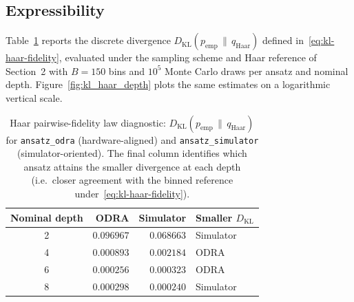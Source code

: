 \documentclass[11pt]{article}
\begin{document}
\subsection{Expressibility}

Table~\ref{tab:kl_haar} reports the discrete divergence $D_{\mathrm{KL}}(p_{\mathrm{emp}}\,\|\,q_{\mathrm{Haar}})$ defined in~\eqref{eq:kl-haar-fidelity}, evaluated under the sampling scheme and Haar reference of Section~2 with $B=150$ bins and $10^{5}$ Monte Carlo draws per ansatz and nominal depth. Figure~\ref{fig:kl_haar_depth} plots the same estimates on a logarithmic vertical scale.

\begin{table}[htbp]
    \centering
    \caption{Haar pairwise-fidelity law diagnostic: $D_{\mathrm{KL}}(p_{\mathrm{emp}}\,\|\,q_{\mathrm{Haar}})$ for \texttt{ansatz\_odra} (hardware-aligned) and \texttt{ansatz\_simulator} (simulator-oriented). The final column identifies which ansatz attains the smaller divergence at each depth (i.e.\ closer agreement with the binned reference under~\eqref{eq:kl-haar-fidelity}).}
    \label{tab:kl_haar}
    \renewcommand{\arraystretch}{1.15}
    \begin{tabular}{c r r l}
        \toprule
        \textbf{Nominal depth} & \textbf{ODRA} & \textbf{Simulator} & \textbf{Smaller $D_{\mathrm{KL}}$} \\
        \midrule
        2 & $0.096967$ & $0.068663$ & Simulator \\
        4 & $0.000893$ & $0.002184$ & ODRA \\
        6 & $0.000256$ & $0.000323$ & ODRA \\
        8 & $0.000298$ & $0.000240$ & Simulator \\
        \bottomrule
    \end{tabular}
\end{table}
\end{document}
